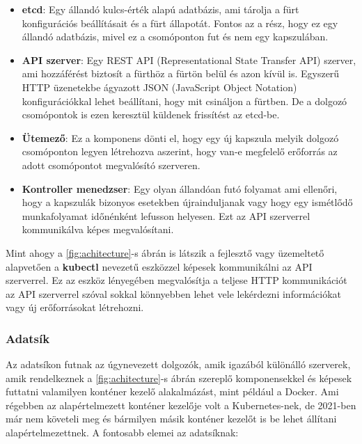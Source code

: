 \begin{itemize}
	\item \textbf{etcd}: Egy állandó kulcs-érték alapú adatbázis, ami tárolja 
	a fürt konfigurációs beállításait és a fürt állapotát. Fontos az a rész, 
	hogy ez egy állandó adatbázis, mivel ez a csomóponton fut és nem egy 
	kapszulában.   
	\item \textbf{API szerver}: Egy REST API (Representational State Transfer API) 
	szerver, ami hozzáférést biztosít a fürthöz a fürtön belül és azon kívül is. 
	Egyszerű HTTP üzenetekbe ágyazott JSON (JavaScript Object Notation) konfigurációkkal
	lehet beállítani, hogy mit csináljon a fürtben. De a dolgozó csomópontok is ezen 
	keresztül küldenek frissítést az etcd-be. 
	\item \textbf{Ütemező}: Ez a komponens dönti el, hogy egy új kapszula melyik
	dolgozó csomóponton legyen létrehozva aszerint, hogy van-e megfelelő erőforrás
	az adott csomópontot megvalósító szerveren.
	\item \textbf{Kontroller menedzser}: Egy olyan állandóan futó folyamat ami ellenőri,
	hogy a kapszulák bizonyos esetekben újrainduljanak vagy hogy egy ismétlődő 
	munkafolyamat időnénként lefusson helyesen. Ezt az API szerverrel kommunikálva
	képes megvalósítani. 
\end{itemize}

Mint ahogy a \ref{fig:achitecture}-s ábrán is látszik a fejlesztő vagy üzemeltető alapvetően a \textbf{kubectl}
nevezetű eszközzel képesek kommunikálni az API szerverrel. Ez az eszköz lényegében
megvalósítja a teljese HTTP kommunikációt az API szerverrel szóval sokkal könnyebben 
lehet vele lekérdezni információkat vagy új erőforrásokat létrehozni. 

\subsubsection{Adatsík}

Az adatsíkon futnak az úgynevezett dolgozók, amik igazából különálló szerverek,
amik rendelkeznek a \ref{fig:achitecture}-s ábrán szereplő komponensekkel és képesek futtatni 
valamilyen konténer kezelő alakalmázást, mint például a Docker. Ami régebben az 
alapértelmezett konténer kezelője volt a Kubernetes-nek, de 2021-ben már nem 
követeli meg és bármilyen másik konténer kezelőt is be lehet állítani alapértelmezettnek.
A fontosabb elemei az adatsíknak:

